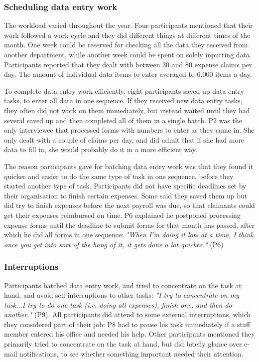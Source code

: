 \subsubsection{Scheduling data entry work}
The workload varied throughout the year. Four participants mentioned that their work followed a work cycle and they did different things at different times of the month. One week could be reserved for checking all the data they received from another department, while another week could be spent on solely inputting data. Participants reported that they dealt with between 30 and 80 expense claims per day. The amount of individual data items to enter averaged to 6,000 items a day. 

To complete data entry work efficiently, eight participants saved up data entry tasks, to enter all data in one sequence. If they received new data entry tasks, they often did not work on them immediately, but instead waited until they had several saved up and then completed all of them in a single batch. P2 was the only interviewee that processed forms with numbers to enter as they came in. She only dealt with a couple of claims per day, and did admit that if she had more data to fill in, she would probably do it in a more efficient way.

The reason participants gave for batching data entry work was that they found it quicker and easier to do the same type of task in one sequence, before they started another type of task. Participants did not have specific deadlines set by their organisation to finish certain expenses. Some said they saved them up but did try to finish expenses before the next payroll was due, so that claimants could get their expenses reimbursed on time. P6 explained he postponed processing expense forms until the deadline to submit forms for that month has passed, after which he did all forms in one sequence: \textit{"When I’m doing it lots at a time, I think once you get into sort of the hang of it, it gets done a lot quicker."} (P6)

\subsubsection{Interruptions}
Participants batched data entry work, and tried to concentrate on the task at hand, and avoid self-interruptions to other tasks: \textit{"I try to concentrate on my task...I try to do one task (i.e. doing all expenses), finish one, and then do another."} (P9). All participants did attend to some external interruptions, which they considered part of their job: P8 had to pause his task immediately if a staff member entered his office and needed his help. Other participants mentioned they primarily tried to concentrate on the task at hand, but did briefly glance over e-mail notifications, to see whether something important needed their attention.

